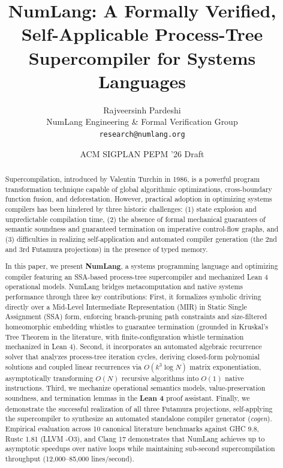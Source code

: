 \documentclass[10pt,twocolumn]{article}
\title{\textbf{NumLang: A Formally Verified, Self-Applicable Process-Tree Supercompiler for Systems Languages}}
\author{Rajveersinh Pardeshi \\ NumLang Engineering \& Formal Verification Group \\ \texttt{research@numlang.org}}
\date{ACM SIGPLAN PEPM '26 Draft}
\begin{document}
\maketitle

\begin{abstract}
Supercompilation, introduced by Valentin Turchin in 1986, is a powerful program transformation technique capable of global algorithmic optimizations, cross-boundary function fusion, and deforestation. However, practical adoption in optimizing systems compilers has been hindered by three historic challenges: (1) state explosion and unpredictable compilation time, (2) the absence of formal mechanical guarantees of semantic soundness and guaranteed termination on imperative control-flow graphs, and (3) difficulties in realizing self-application and automated compiler generation (the 2nd and 3rd Futamura projections) in the presence of typed memory.

In this paper, we present \textbf{NumLang}, a systems programming language and optimizing compiler featuring an SSA-based process-tree supercompiler and mechanized Lean 4 operational models. NumLang bridges metacomputation and native systems performance through three key contributions:
First, it formalizes symbolic driving directly over a Mid-Level Intermediate Representation (MIR) in Static Single Assignment (SSA) form, enforcing branch-pruning path constraints and size-filtered homeomorphic embedding whistles to guarantee termination (grounded in Kruskal's Tree Theorem in the literature, with finite-configuration whistle termination mechanized in Lean 4).
Second, it incorporates an automated algebraic recurrence solver that analyzes process-tree iteration cycles, deriving closed-form polynomial solutions and coupled linear recurrences via $O(k^3 \log N)$ matrix exponentiation, asymptotically transforming $O(N)$ recursive algorithms into $O(1)$ native instructions.
Third, we mechanize operational semantics models, value-preservation soundness, and termination lemmas in the \textbf{Lean 4} proof assistant.
Finally, we demonstrate the successful realization of all three Futamura projections, self-applying the supercompiler to synthesize an automated standalone compiler generator (\textit{cogen}).
Empirical evaluation across 10 canonical literature benchmarks against GHC 9.8, Rustc 1.81 (LLVM -O3), and Clang 17 demonstrates that NumLang achieves up to asymptotic speedups over native loops while maintaining sub-second supercompilation throughput (12,000--85,000 lines/second).
\end{abstract}
\end{document}
